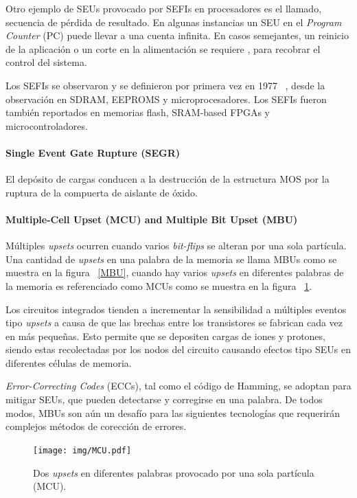 \documentclass[a4paper,openright,12pt]{report}
\begin{document}
Otro ejemplo de SEUs provocado por SEFIs en procesadores es el llamado, secuencia de pérdida de resultado. En algunas instancias un SEU en el \textit{Program Counter} (PC) puede llevar a una cuenta infinita. En casos semejantes, un reinicio de la aplicación o un corte en la alimentación se requiere , para recobrar el control del sistema.

Los SEFIs se observaron  y se definieron por primera vez en 1977  ~\cite{koga1997single}, desde la observación en SDRAM, EEPROMS y microprocesadores. Los SEFIs fueron también reportados en memorias flash, SRAM-based FPGAs y microcontroladores.
\pagebreak

\paragraph{Single Event Gate Rupture (SEGR) } \hfill \break

El depósito de cargas conducen a la destrucción de la estructura MOS por la ruptura de la compuerta de aislante de óxido.

\paragraph{Multiple-Cell Upset  (MCU)  and Multiple Bit Upset  (MBU)}  \hfill \break

Múltiples \textit{upsets} ocurren cuando varios \textit{bit-flips} se alteran por una sola partícula. Una cantidad de \textit{upsets} en una palabra de la memoria se llama MBUs como se muestra en la figura ~\ref{MBU}, cuando hay varios \textit{upsets} en diferentes palabras de la memoria es referenciado como MCUs como se muestra en la figura ~\ref{MCU}.

Los circuitos integrados tienden a incrementar la sensibilidad a múltiples eventos tipo \textit{upsets} a causa de que las brechas entre los transistores se fabrican cada vez en más pequeñas. Esto permite que se depositen cargas de iones y protones, siendo estas recolectadas por los nodos del circuito causando efectos tipo SEUs en diferentes células de memoria.

\textit{Error-Correcting Codes}  (ECCs), tal como el código de Hamming, se adoptan para mitigar SEUs, que pueden  detectarse y corregirse en una palabra. De todos modos, MBUs son aún un desafío para las siguientes tecnologías que requerirán complejos métodos de corección de errores. 

\begin{figure}[H]
	\centering
	\texttt{[image: img/MCU.pdf]}
	\caption{Dos \textit{upsets} en diferentes palabras provocado por una sola partícula (MCU).}
	\label{MCU}
\end{figure}
\end{document}
